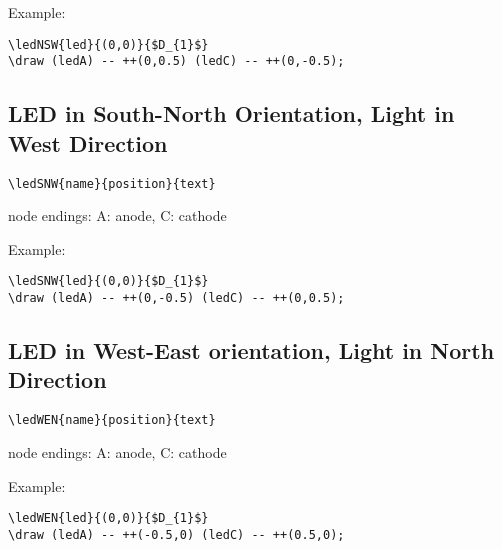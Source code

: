 \documentclass[parskip=full]{scrartcl}
\begin{document}
Example:\\
\begin{minipage}{0.8\textwidth}
\begin{verbatim}
\ledNSW{led}{(0,0)}{$D_{1}$}
\draw (ledA) -- ++(0,0.5) (ledC) -- ++(0,-0.5);
\end{verbatim}
\end{minipage}
\begin{minipage}{0.19\textwidth}
\end{minipage}

\subsection{LED in South-North Orientation, Light in West Direction}

\begin{verbatim}
\ledSNW{name}{position}{text}
\end{verbatim}
node endings: A: anode, C: cathode

Example:\\
\begin{minipage}{0.8\textwidth}
\begin{verbatim}
\ledSNW{led}{(0,0)}{$D_{1}$}
\draw (ledA) -- ++(0,-0.5) (ledC) -- ++(0,0.5);
\end{verbatim}
\end{minipage}
\begin{minipage}{0.19\textwidth}
\end{minipage}

\subsection{LED in West-East orientation, Light in North Direction}

\begin{verbatim}
\ledWEN{name}{position}{text}
\end{verbatim}
node endings: A: anode, C: cathode

Example:\\
\begin{minipage}{0.8\textwidth}
\begin{verbatim}
\ledWEN{led}{(0,0)}{$D_{1}$}
\draw (ledA) -- ++(-0.5,0) (ledC) -- ++(0.5,0);
\end{verbatim}
\end{minipage}
\begin{minipage}{0.19\textwidth}
\end{minipage}
\end{document}
